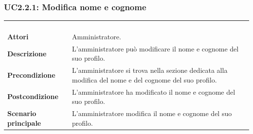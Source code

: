 \subsubsection{UC2.2.1: Modifica nome e cognome}
\label{UC2.2.1}
\begin{longtable}{l|p{10cm}}
\rowcolor[gray]{0.8} \multicolumn{2}{c}{} \\
\rowcolor[gray]{0.8} \multicolumn{2}{c}{\textbf{UC2.2.1 - Modifica nome e cognome}} \\
\rowcolor[gray]{0.8} \multicolumn{2}{c}{} \\
\hline
&\\
\textbf{Attori} & Amministratore.\\[7pt]
\textbf{Descrizione} & L'amministratore può modificare il nome e cognome del suo profilo.\\[7pt]
\textbf{Precondizione} & L'amministratore si trova nella sezione dedicata alla modifica del nome e del cognome del suo profilo.\\[7pt]
\textbf{Postcondizione} & L'amministratore ha modificato il nome e cognome del suo profilo.\\[7pt]
\textbf{Scenario principale} &L'amministratore modifica il nome e cognome del suo profilo.\\[7pt]\hline
\end{longtable}

